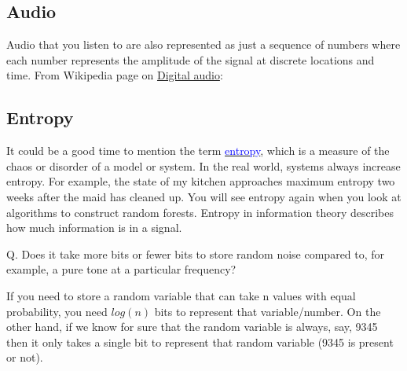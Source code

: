 \begin{fullwidth}
\subsection{Audio}

Audio that you listen to are also represented as just a sequence of numbers where each number represents the amplitude of the signal at discrete locations and time. From Wikipedia page on \href{https://en.wikipedia.org/wiki/Digital_audio}{Digital audio}:


\subsection{Entropy}

It could be a good time to mention the term \href{https://en.wikipedia.org/wiki/Entropy_\%28information_theory\%29}{\textcolor{blue}{entropy}}, which is a measure of the chaos or disorder of a model or system. In the real world, systems always increase entropy. For example, the state of my kitchen approaches maximum entropy two weeks after the maid has cleaned up. You will see entropy again when you look at algorithms to construct random forests. Entropy in information theory describes how much information is in a signal.

Q.  Does it take more bits or fewer bits to store random noise compared to, for example, a pure tone at a particular frequency?

If you need to store a random variable that can take n values with equal probability, you need $log(n)$ bits to represent that variable/number. On the other hand, if we know for sure that the random variable is always, say, 9345 then it only takes a single bit to represent that random variable (9345 is present or not).
 

\end{fullwidth}
